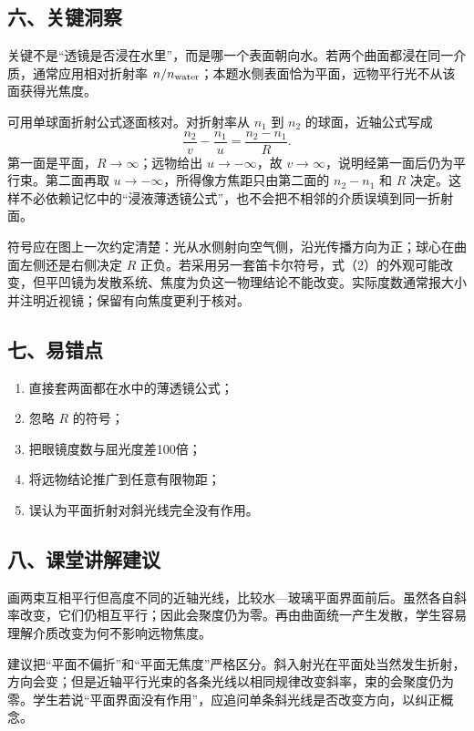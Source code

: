 \documentclass[12pt,a4paper,UTF8]{ctexart}
\newcommand{\tightlist}{\setlength{\itemsep}{0pt}\setlength{\parskip}{0pt}}
\begin{document}
\subsection{六、关键洞察}\label{ux516dux5173ux952eux6d1eux5bdf-2}

关键不是``透镜是否浸在水里''，而是哪一个表面朝向水。若两个曲面都浸在同一介质，通常应用相对折射率
\(n/n_{\rm water}\)；本题水侧表面恰为平面，远物平行光不从该面获得光焦度。

可用单球面折射公式逐面核对。对折射率从 \(n_1\) 到 \(n_2\)
的球面，近轴公式写成 \[
\frac{n_2}{v}-\frac{n_1}{u}=\frac{n_2-n_1}{R}.
\] 第一面是平面，\(R\to\infty\)；远物给出 \(u\to-\infty\)，故
\(v\to\infty\)，说明经第一面后仍为平行束。第二面再取
\(u\to-\infty\)，所得像方焦距只由第二面的 \(n_2-n_1\) 和 \(R\)
决定。这样不必依赖记忆中的``浸液薄透镜公式''，也不会把不相邻的介质误填到同一折射面。

符号应在图上一次约定清楚：光从水侧射向空气侧，沿光传播方向为正；球心在曲面左侧还是右侧决定
\(R\)
正负。若采用另一套笛卡尔符号，式（2）的外观可能改变，但平凹镜为发散系统、焦度为负这一物理结论不能改变。实际度数通常报大小并注明近视镜；保留有向焦度更利于核对。

\subsection{七、易错点}\label{ux4e03ux6613ux9519ux70b9-2}

\begin{enumerate}
\def\labelenumi{\arabic{enumi}.}
\tightlist
\item
  直接套两面都在水中的薄透镜公式；
\item
  忽略 \(R\) 的符号；
\item
  把眼镜度数与屈光度差100倍；
\item
  将远物结论推广到任意有限物距；
\item
  误认为平面折射对斜光线完全没有作用。
\end{enumerate}

\subsection{八、课堂讲解建议}\label{ux516bux8bfeux5802ux8bb2ux89e3ux5efaux8bae-2}

画两束互相平行但高度不同的近轴光线，比较水---玻璃平面界面前后。虽然各自斜率改变，它们仍相互平行；因此会聚度仍为零。再由曲面统一产生发散，学生容易理解介质改变为何不影响远物焦度。

建议把``平面不偏折''和``平面无焦度''严格区分。斜入射光在平面处当然发生折射，方向会变；但是近轴平行光束的各条光线以相同规律改变斜率，束的会聚度仍为零。学生若说``平面界面没有作用''，应追问单条斜光线是否改变方向，以纠正概念。
\end{document}
